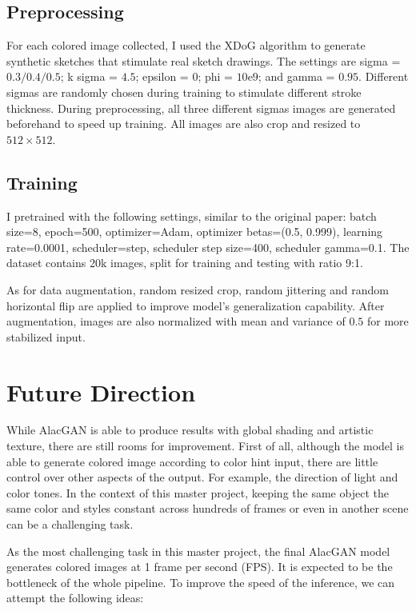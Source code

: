 \subsection{Preprocessing}
For each colored image collected, I used the XDoG\cite{winnemollerXDoGEXtendedDifferenceofGaussians2012} algorithm to generate synthetic sketches that stimulate real sketch drawings. The settings are sigma = $0.3/0.4/0.5$; k sigma = $4.5$; epsilon = $0$; phi = $10\mathrm{e}9$; and gamma = $0.95$. Different sigmas are randomly chosen during training to stimulate different stroke thickness. During preprocessing, all three different sigmas images are generated beforehand to speed up training. All images are also crop and resized to $512\times512$.

\subsection{Training}
I pretrained with the following settings, similar to the original paper: batch size=8, epoch=500, optimizer=Adam, optimizer betas=(0.5, 0.999), learning rate=0.0001, scheduler=step, scheduler step size=400, scheduler gamma=0.1. The dataset contains 20k images, split for training and testing with ratio 9:1.

As for data augmentation, random resized crop, random jittering and random horizontal flip are applied to improve model's generalization capability. After augmentation, images are also normalized with mean and variance of $0.5$ for more stabilized input.



\section{Future Direction}
While AlacGAN is able to produce results with global shading and artistic texture, there are still rooms for improvement. First of all, although the model is able to generate colored image according to color hint input, there are little control over other aspects of the output. For example, the direction of light and color tones. In the context of this master project, keeping the same object the same color and styles constant across hundreds of frames or even in another scene can be a challenging task.

As the most challenging task in this master project, the final AlacGAN model generates colored images at 1 frame per second (FPS). It is expected to be the bottleneck of the whole pipeline. To improve the speed of the inference, we can attempt the following ideas:

